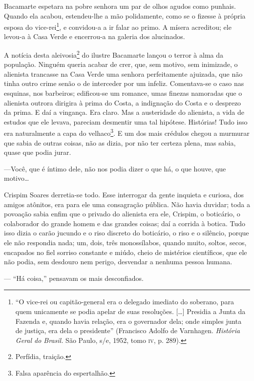 Bacamarte espetara na pobre senhora um par de olhos agudos como punhais.
Quando ela acabou, estendeu-lhe a mão polidamente, como se o fizesse à
própria esposa do vice-rei\footnote{``O vice-rei ou capitão-general era
  o delegado imediato do soberano, para quem unicamente se podia apelar
  de suas resoluções. {[}\ldots{}{]} Presidia a Junta da Fazenda e,
  quando havia relação, era o governador dela; onde simples junta de
  justiça, era dela o presidente'' (Francisco Adolfo de Varnhagen.
  \emph{História Geral do Brasil.} São Paulo, s/e, 1952, tomo \textsc{iv}, p.
  289).}, e convidou-a a ir falar ao primo. A mísera acreditou; ele
levou-a à Casa Verde e encerrou-a na galeria dos alucinados.

A notícia desta aleivosia\footnote{Perfídia, traição.} do ilustre
Bacamarte lançou o terror à alma da população. Ninguém queria acabar de
crer, que, sem motivo, sem inimizade, o alienista trancasse na Casa
Verde uma senhora perfeitamente ajuizada, que não tinha outro crime
senão o de interceder por um infeliz. Comentava-se o caso nas esquinas,
nos barbeiros; edificou-se um romance, umas finezas namoradas que o
alienista outrora dirigira à prima do Costa, a indignação do Costa e o
desprezo da prima. E daí a vingança. Era claro. Mas a austeridade do
alienista, a vida de estudos que ele levava, pareciam desmentir uma tal
hipótese. Histórias! Tudo isso era naturalmente a capa do
velhaco\footnote{Falsa aparência do espertalhão.}. E um dos mais
crédulos chegou a murmurar que sabia de outras coisas, não as dizia, por
não ter certeza plena, mas sabia, quase que podia jurar.

---Você, que é íntimo dele, não nos podia dizer o que há, o que houve,
que motivo\ldots{}

Crispim Soares derretia-se todo. Esse interrogar da gente inquieta e
curiosa, dos amigos atônitos, era para ele uma consagração pública. Não
havia duvidar; toda a povoação sabia enfim que o privado do alienista
era ele, Crispim, o boticário, o colaborador do grande homem e das
grandes coisas; daí a corrida à botica. Tudo isso dizia o carão jucundo
e o riso discreto do boticário, o riso e o silêncio, porque ele não
respondia nada; um, dois, três monossílabos, quando muito, soltos,
secos, encapados no fiel sorriso constante e miúdo, cheio de mistérios
científicos, que ele não podia, sem desdouro nem perigo, desvendar a
nenhuma pessoa humana.

--- ``Há coisa,'' pensavam os mais desconfiados.

